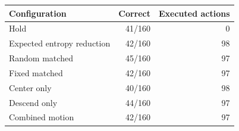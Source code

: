 \begin{tabular}{lrr}
\toprule
Configuration & Correct & Executed actions \\
\midrule
Hold & 41/160 & 0 \\
Expected entropy reduction & 42/160 & 98 \\
Random matched & 45/160 & 97 \\
Fixed matched & 42/160 & 97 \\
Center only & 40/160 & 98 \\
Descend only & 44/160 & 97 \\
Combined motion & 42/160 & 97 \\
\bottomrule
\end{tabular}
